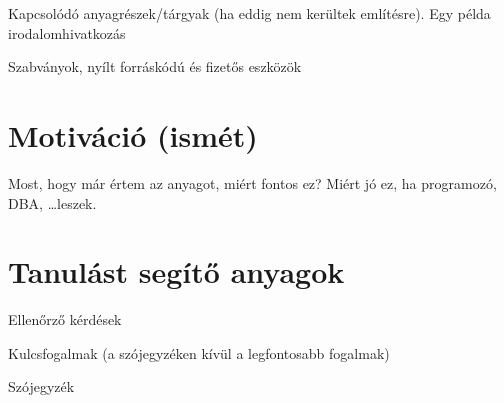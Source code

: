 Kapcsolódó anyagrészek/tárgyak (ha eddig nem kerültek említésre). Egy példa irodalomhivatkozás~\cite{DBLP:books/cs/Ullman88}

Szabványok, nyílt forráskódú és fizetős eszközök

\section{Motiváció (ismét)}

Most, hogy már értem az anyagot, miért fontos ez? Miért jó ez, ha programozó, DBA, \ldots leszek.

\section{Tanulást segítő anyagok}

Ellenőrző kérdések

Kulcsfogalmak (a szójegyzéken kívül a legfontosabb fogalmak)

Szójegyzék